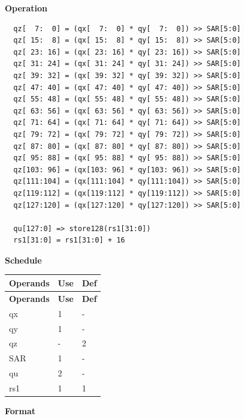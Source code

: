 \textbf{Operation}\\
\begin{lstlisting}
  qz[  7:  0] = (qx[  7:  0] * qy[  7:  0]) >> SAR[5:0]
  qz[ 15:  8] = (qx[ 15:  8] * qy[ 15:  8]) >> SAR[5:0]
  qz[ 23: 16] = (qx[ 23: 16] * qy[ 23: 16]) >> SAR[5:0]
  qz[ 31: 24] = (qx[ 31: 24] * qy[ 31: 24]) >> SAR[5:0]
  qz[ 39: 32] = (qx[ 39: 32] * qy[ 39: 32]) >> SAR[5:0]
  qz[ 47: 40] = (qx[ 47: 40] * qy[ 47: 40]) >> SAR[5:0]
  qz[ 55: 48] = (qx[ 55: 48] * qy[ 55: 48]) >> SAR[5:0]
  qz[ 63: 56] = (qx[ 63: 56] * qy[ 63: 56]) >> SAR[5:0]
  qz[ 71: 64] = (qx[ 71: 64] * qy[ 71: 64]) >> SAR[5:0]
  qz[ 79: 72] = (qx[ 79: 72] * qy[ 79: 72]) >> SAR[5:0]
  qz[ 87: 80] = (qx[ 87: 80] * qy[ 87: 80]) >> SAR[5:0]
  qz[ 95: 88] = (qx[ 95: 88] * qy[ 95: 88]) >> SAR[5:0]
  qz[103: 96] = (qx[103: 96] * qy[103: 96]) >> SAR[5:0]
  qz[111:104] = (qx[111:104] * qy[111:104]) >> SAR[5:0]
  qz[119:112] = (qx[119:112] * qy[119:112]) >> SAR[5:0]
  qz[127:120] = (qx[127:120] * qy[127:120]) >> SAR[5:0]

  qu[127:0] => store128(rs1[31:0])
  rs1[31:0] = rs1[31:0] + 16
\end{lstlisting}


\textbf{Schedule}\\
\begin{longtable}[c]{|l|l|l|}
    \hline
    \rowcolor{lightgray}
    \textbf{Operands} & \textbf{Use} & \textbf{Def} \\\hline
    \endfirsthead
    \hline
    \rowcolor{lightgray}
     \textbf{Operands} & \textbf{Use} & \textbf{Def} \\\hline
    \endhead
    \hline
    \endfoot

    qx & 1 & - \\\hline
  qy & 1 & - \\\hline
     qz & - & 2 \\\hline
    SAR & 1 & - \\\hline
    qu & 2 & - \\\hline
    rs1 & 1 & 1

\end{longtable}

\textbf{Format}\\

